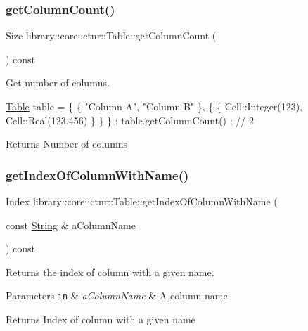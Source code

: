 \subsubsection{\texorpdfstring{get\+Column\+Count()}{getColumnCount()}}
{\footnotesize\ttfamily Size library\+::core\+::ctnr\+::\+Table\+::get\+Column\+Count (\begin{DoxyParamCaption}{ }\end{DoxyParamCaption}) const}



Get number of columns. 


\begin{DoxyCode}
\hyperlink{classlibrary_1_1core_1_1ctnr_1_1_table_a5b11121caa4288c3da642af7c6a5a632}{Table} table = \{ \{ \textcolor{stringliteral}{"Column A"}, \textcolor{stringliteral}{"Column B"} \}, \{ \{ Cell::Integer(123), Cell::Real(123.456) \} \} \} ;
table.getColumnCount() ; \textcolor{comment}{// 2}
\end{DoxyCode}


\begin{DoxyReturn}{Returns}
Number of columns 
\end{DoxyReturn}
\mbox{\label{classlibrary_1_1core_1_1ctnr_1_1_table_a6144fd9e6f0e18bb17f457a32ab3c027}} 
\subsubsection{\texorpdfstring{get\+Index\+Of\+Column\+With\+Name()}{getIndexOfColumnWithName()}}
{\footnotesize\ttfamily Index library\+::core\+::ctnr\+::\+Table\+::get\+Index\+Of\+Column\+With\+Name (\begin{DoxyParamCaption}\item[{const \hyperlink{classlibrary_1_1core_1_1types_1_1_string}{String} \&}]{a\+Column\+Name }\end{DoxyParamCaption}) const}



Returns the index of column with a given name. 


\begin{DoxyParams}[1]{Parameters}
\mbox{\tt in}  & {\em a\+Column\+Name} & A column name \\
\hline
\end{DoxyParams}
\begin{DoxyReturn}{Returns}
Index of column with a given name 
\end{DoxyReturn}
\mbox{\label{classlibrary_1_1core_1_1ctnr_1_1_table_a18036491993fea84dd2a595e7703258f}} 
